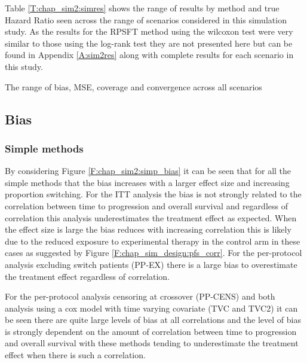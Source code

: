 Table \ref{T:chap_sim2:simres} shows the range of results by method and true Hazard Ratio seen across the range of scenarios considered in this simulation study. As the results for the RPSFT method using the wilcoxon test were very similar to those using the log-rank test they are not presented here but can be found in Appendix \ref{A:sim2res} along with complete results for each scenario in this study. 

\begin{table}[ht] 
\caption{The range of bias, MSE, coverage and convergence across all scenarios}
\centering 

\label{T:chap_sim2:simres}
\end{table}


\subsection{Bias}
\subsubsection{Simple methods}
By considering Figure \ref{F:chap_sim2:simp_bias} it can be seen that for all the simple methods that the bias increases with a larger effect size and increasing proportion switching. For the ITT analysis the bias is not strongly related to the correlation between time to progression and overall survival and regardless of correlation this analysis underestimates the treatment effect as expected. When the effect size is large the bias reduces with increasing correlation this is likely due to the reduced exposure to experimental therapy in the control arm in these cases as suggested by Figure \ref{F:chap_sim_design:pfs_corr}. For the per-protocol analysis excluding switch patients (PP-EX) there is a large bias to overestimate the treatment effect regardless of correlation. 

For the per-protocol analysis censoring at crossover (PP-CENS) and both analysis using a cox model with time varying covariate (TVC and TVC2) it can be seen there are quite large levels of bias at all correlations and the level of bias is strongly dependent on the amount of correlation between time to progression and overall survival with these methods tending to underestimate the treatment effect when there is such a correlation. 

